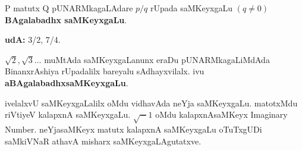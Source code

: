 {\rm P} matutx {\rm Q} pUNARMkagaLAdare $p/q$ rUpada saMKeyxgaLu $(q\neq 0)$ \textbf{BAgalabadhx saMKeyxgaLu}.

\textbf{udA:} {\rm 3/2, 7/4}.

${\sqrt 2}, {\sqrt 3}\ldots$ muMtAda saMKeyxgaLanunx eraDu pUNARMkagaLiMdAda Binanx\-rAshiya rUpadalilx bareyalu sAdhayxvilalx. ivu \textbf{aBAgalabadhxsaMKeyxgaLu}.

ivelalxvU saMKeyxgaLalilx oMdu vidhavAda neYja saMKeyxgaLu. matotxMdu riVtiyeV kalapxnA  saMKeyxgaLu. $\sqrt-1$ oMdu kalapxnAsaMKeyx {\rm Imaginary Number}. neYjasaMKeyx matutx kalapxnA saMKeyxgaLu oTuTxgUDi saMkiVNaR athavA misharx saMKeyxgaLAgutatxve. 
